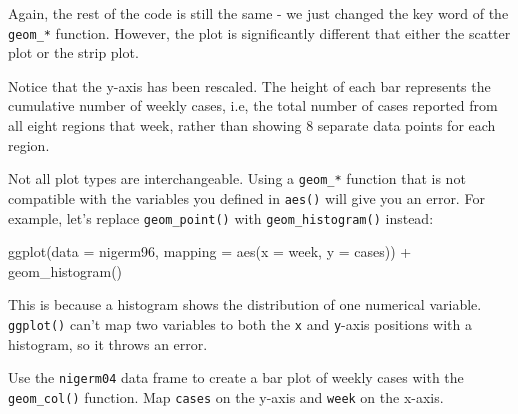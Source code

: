 \documentclass[
  letterpaper,
  DIV=11,
  numbers=noendperiod]{scrreprt}
\newenvironment{Shaded}{\begin{snugshade}}{\end{snugshade}}
\newcommand{\AttributeTok}[1]{\textcolor[rgb]{0.40,0.45,0.13}{#1}}
\newcommand{\FunctionTok}[1]{\textcolor[rgb]{0.28,0.35,0.67}{#1}}
\newcommand{\NormalTok}[1]{\textcolor[rgb]{0.00,0.23,0.31}{#1}}
\newcommand{\SpecialCharTok}[1]{\textcolor[rgb]{0.37,0.37,0.37}{#1}}
\begin{document}
Again, the rest of the code is still the same - we just changed the key
word of the \texttt{geom\_*} function. However, the plot is
significantly different that either the scatter plot or the strip plot.

Notice that the y-axis has been rescaled. The height of each bar
represents the cumulative number of weekly cases, i.e, the total number
of cases reported from all eight regions that week, rather than showing
8 separate data points for each region.

\begin{tcolorbox}[enhanced jigsaw, titlerule=0mm, colback=white, left=2mm, breakable, opacitybacktitle=0.6, colbacktitle=quarto-callout-caution-color!10!white, colframe=quarto-callout-caution-color-frame, bottomtitle=1mm, opacityback=0, coltitle=black, arc=.35mm, toptitle=1mm, title=\textcolor{quarto-callout-caution-color}{\faFire}\hspace{0.5em}{Caution}, leftrule=.75mm, toprule=.15mm, bottomrule=.15mm, rightrule=.15mm]

Not all plot types are interchangeable. Using a \texttt{geom\_*}
function that is not compatible with the variables you defined in
\texttt{aes()} will give you an error. For example, let's replace
\texttt{geom\_point()} with \texttt{geom\_histogram()} instead:

\begin{Shaded}
\begin{Highlighting}[]
\FunctionTok{ggplot}\NormalTok{(}\AttributeTok{data =}\NormalTok{ nigerm96, }
       \AttributeTok{mapping =} \FunctionTok{aes}\NormalTok{(}\AttributeTok{x =}\NormalTok{ week, }
                     \AttributeTok{y =}\NormalTok{ cases)) }\SpecialCharTok{+}
  \FunctionTok{geom\_histogram}\NormalTok{()}
\end{Highlighting}
\end{Shaded}

This is because a histogram shows the distribution of one numerical
variable. \texttt{ggplot()} can't map two variables to both the
\texttt{x} and \texttt{y}-axis positions with a histogram, so it throws
an error.

\end{tcolorbox}

\begin{tcolorbox}[enhanced jigsaw, titlerule=0mm, colback=white, left=2mm, breakable, opacitybacktitle=0.6, colbacktitle=quarto-callout-tip-color!10!white, colframe=quarto-callout-tip-color-frame, bottomtitle=1mm, opacityback=0, coltitle=black, arc=.35mm, toptitle=1mm, title=\textcolor{quarto-callout-tip-color}{\faLightbulb}\hspace{0.5em}{Practice}, leftrule=.75mm, toprule=.15mm, bottomrule=.15mm, rightrule=.15mm]

Use the \texttt{nigerm04} data frame to create a bar plot of weekly
cases with the \texttt{geom\_col()} function. Map \texttt{cases} on the
y-axis and \texttt{week} on the x-axis.

\end{tcolorbox}
\end{document}
